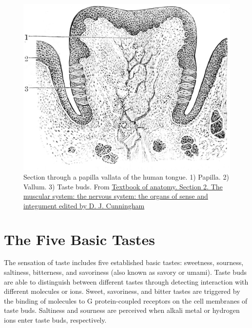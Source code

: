 \begin{figure}

{\centering \includegraphics[width=0.7\linewidth]{./figures/gustatory/CunninghamSection2Page770} 

}

\caption{Section through a papilla vallata of the human tongue. 1) Papilla. 2) Vallum. 3) Taste buds. From \href{https://wellcomelibrary.org/item/b21271070}{Textbook of anatomy. Section 2. The muscular system: the nervous system: the organs of sense and integument edited by D. J. Cunningham}}\label{fig:vallatepapilla}
\end{figure}

\hypertarget{the-five-basic-tastes}{%
\section{The Five Basic Tastes}\label{the-five-basic-tastes}}

The sensation of taste includes five established basic tastes: sweetness, sourness, saltiness, bitterness, and savoriness (also known as savory or umami). Taste buds are able to distinguish between different tastes through detecting interaction with different molecules or ions. Sweet, savoriness, and bitter tastes are triggered by the binding of molecules to G protein-coupled receptors on the cell membranes of taste buds. Saltiness and sourness are perceived when alkali metal or hydrogen ions enter taste buds, respectively.



